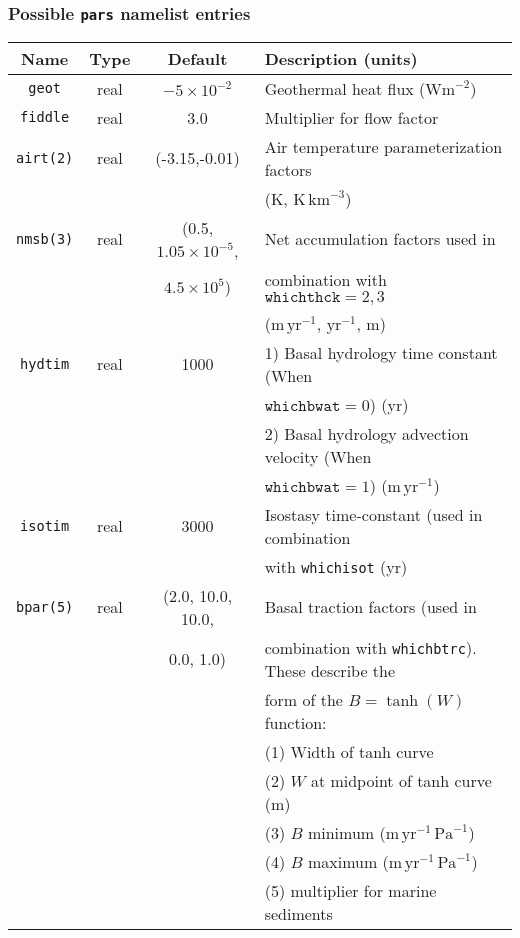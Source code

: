 \documentclass[11pt]{article}
\begin{document}
\subsubsection{Possible \texttt{pars} namelist entries}
%
\begin{center}
\begin{tabular}{|c|c|c|l|}
\hline
Name & Type & Default & Description (units)\\
\hline
\hline
\texttt{geot} & real & $-5\times 10^{-2}$ & Geothermal heat flux
($\mathrm{Wm}^{-2}$) \\
\hline
\texttt{fiddle} & real & 3.0 & Multiplier for flow factor \\
\hline
\texttt{airt(2)} & real & (-3.15,-0.01) & Air temperature parameterization
factors \\
 & & & (K, $\mathrm{K}\,\mathrm{km}^{-3}$) \\
\hline
\texttt{nmsb(3)} & real & (0.5, $1.05\times 10^{-5}$,  & Net accumulation
factors used in \\
 & & $4.5\times 10^{5}$) & combination with $\mathtt{whichthck}=2,3$ \\
 & & & ($\mathrm{m}\,\mathrm{yr}^{-1}$, $\mathrm{yr}^{-1}$, m) \\
\hline
\texttt{hydtim} & real & 1000 & 1) Basal hydrology time constant (When \\
 & & & $\mathtt{whichbwat}=0$) (yr)\\
 & & & 2) Basal hydrology advection velocity (When \\
 & & & $\mathtt{whichbwat}=1$) ($\mathrm{m}\,\mathrm{yr}^{-1}$)\\
\hline
\texttt{isotim} & real & 3000 & Isostasy time-constant (used in combination \\
 & & & with \texttt{whichisot} (yr) \\
\hline 
\texttt{bpar(5)} & real & (2.0, 10.0, 10.0, & Basal traction factors (used in \\
 & & 0.0, 1.0) & combination with \texttt{whichbtrc}). These describe the \\
 & & & form of the $B=\tanh(W)$ function: \\
 & & & (1) Width of tanh curve \\
 & & & (2) $W$ at midpoint of tanh curve (m) \\
 & & & (3) $B$ minimum ($\mathrm{m}\,\mathrm{yr}^{-1}\,\mathrm{Pa}^{-1}$) \\
 & & & (4) $B$ maximum ($\mathrm{m}\,\mathrm{yr}^{-1}\,\mathrm{Pa}^{-1}$) \\
 & & & (5) multiplier for marine sediments \\
\hline
\end{tabular}
\end{center}
%
\end{document}
